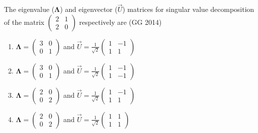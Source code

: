 \item The eigenvalue ($\bm{\Lambda}$) and eigenvector ($\vec{U}$) matrices for singular value decomposition of the matrix $\begin{pmatrix}
    2 & 1 \\
    2 & 0
\end{pmatrix}$ respectively are
\hfill (GG 2014)
\begin{multicols}{2}
\begin{enumerate}
    \item $\bm{\Lambda}=\begin{pmatrix}
        3 & 0\\
        0 & 1
    \end{pmatrix}$ and $\vec{U}=\frac{1}{\sqrt{2}}\begin{pmatrix}
        1 & -1\\
        1 & 1
    \end{pmatrix}$
    \item $\bm{\Lambda}=\begin{pmatrix}
        3 & 0\\
        0 & 1
    \end{pmatrix}$ and $\vec{U}=\frac{1}{\sqrt{2}}\begin{pmatrix}
        1 & -1\\
        1 & -1
    \end{pmatrix}$
    \item $\bm{\Lambda}=\begin{pmatrix}
        2 & 0\\
        0 & 2
    \end{pmatrix}$ and $\vec{U}=\frac{1}{\sqrt{2}}\begin{pmatrix}
        1 & -1\\
        1 & 1
    \end{pmatrix}$
    \item $\bm{\Lambda}=\begin{pmatrix}
        2 & 0\\
        0 & 2
    \end{pmatrix}$ and $\vec{U}=\frac{1}{\sqrt{2}}\begin{pmatrix}
        1 & 1\\
        1 & 1
    \end{pmatrix}$
\end{enumerate}
\end{multicols}

